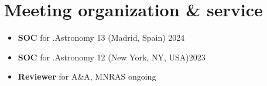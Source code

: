 \section*{Meeting organization \& service}

\begin{itemize}
    \item \textbf{SOC} for .Astronomy 13 (Madrid, Spain) \hfill 2024
    \item \textbf{SOC} for .Astronomy 12 (New York, NY, USA)\hfill 2023
    \item \textbf{Reviewer} for A\&A, MNRAS \hfill ongoing
\end{itemize}